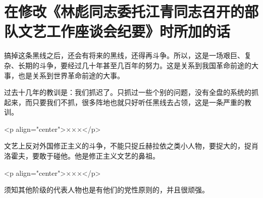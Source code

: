 \section[在修改《林彪同志委托江青同志召开的部队文艺工作座谈会纪要》时所加的话（一九六六年三月）]{在修改《林彪同志委托江青同志召开的部队文艺工作座谈会纪要》时所加的话}


搞掉这条黑线之后，还会有将来的黑线，还得再斗争。所以，这是一场艰巨、复杂、长期的斗争，要经过几十年甚至几百年的努力。这是关系到我国革命前途的大事，也是关系到世界革命前途的大事。

过去十几年的教训是：我们抓迟了。只抓过一些个别的问题，没有全盘的系统的抓起来，而只要我们不抓，很多阵地也就只好听任黑线去占领，这是一条严重的教训。

<p align="center">×××</p>

文艺上反对外国修正主义的斗争，不能只捉丘赫拉依之类小人物，要捉大的，捉肖洛霍夫，要敢于碰他。他是修正主义文艺的鼻祖。

<p align="center">×××</p>

须知其他阶级的代表人物也是有他们的党性原则的，并且很顽强。

